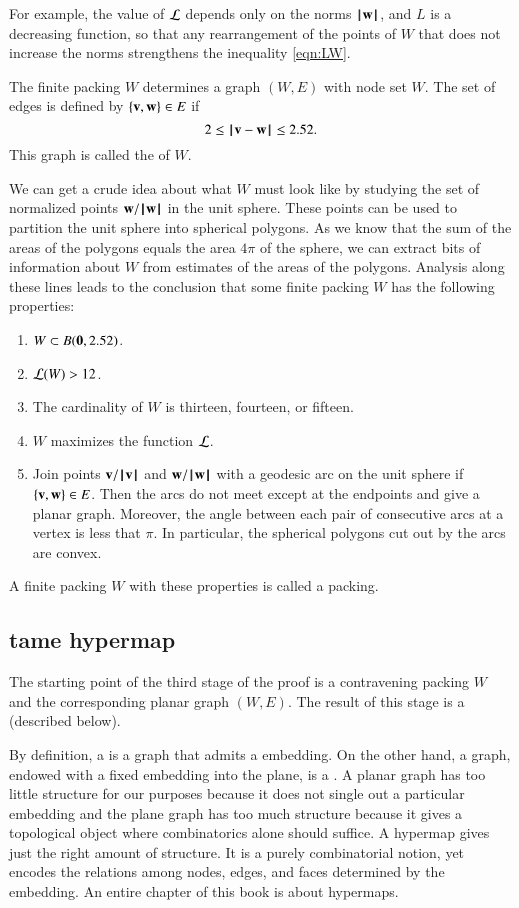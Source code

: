 For example, the value of ${\mathcal L}$
depends only on the norms ${{\hskip0.1em|\hskip-0.15em|\hskip0.1em}{\mathbf w}{\hskip0.1em|\hskip-0.15em|\hskip0.1em}}$, and $L$ is a decreasing
function, so that any rearrangement of the points of $W$ that does not
increase the norms strengthens the inequality \eqref{eqn:LW}.

The finite packing $W$ determines a graph $(W,E)$ with node set $W$.  The set
of edges is defined by $\{{\mathbf v},{\mathbf w}\}\in E$ if 
\[2\le\norm{\v}{\w}\le 2.52.\] This graph is called the  of $W$.

We can get a crude idea about what $W$ must look like by studying the
set of normalized points ${\mathbf w}/{{\hskip0.1em|\hskip-0.15em|\hskip0.1em}{\mathbf w}{\hskip0.1em|\hskip-0.15em|\hskip0.1em}}$ in the unit sphere.  These
points can be used to partition the unit sphere into spherical
polygons.  As we know that the sum of the areas of the polygons equals
the area $4\pi$ of the sphere, we can extract bits of information
about $W$ from estimates of the areas of the polygons.  Analysis along
these lines leads to the conclusion that some finite packing $W$
has the following 
properties:
\begin{enumerate}\wasitemize 
\item $W\subset B({\mathbf 0},2.52)$.
\item ${\mathcal L}(W) > 12$.
\item The cardinality of $W$ is thirteen, fourteen, or fifteen.
\item $W$ maximizes the function ${\mathcal L}$.
\item Join points ${\mathbf v}/{{\hskip0.1em|\hskip-0.15em|\hskip0.1em}{\mathbf v}{\hskip0.1em|\hskip-0.15em|\hskip0.1em}}$ and ${\mathbf w}/{{\hskip0.1em|\hskip-0.15em|\hskip0.1em}{\mathbf w}{\hskip0.1em|\hskip-0.15em|\hskip0.1em}}$ with a geodesic arc on the
unit sphere if $\{{\mathbf v},{\mathbf w}\}\in E$.  Then the arcs do not meet except at the endpoints and
give a planar graph.  Moreover, the angle between each pair of consecutive arcs at a vertex is less
that $\pi$.  In particular, the spherical polygons cut out by the arcs are convex.
\end{enumerate}\wasitemize 
A finite packing $W$ with these properties is called a  packing.


\subsection{tame hypermap}

The starting point of the third stage of the proof is a contravening
packing $W$ and the corresponding planar graph $(W,E)$.  The result of
this stage is a  (described below).

By definition, a  is a graph that admits a
 embedding.  On the other hand, a graph, endowed with
a fixed embedding into the plane, is a .  A
planar graph has too little structure for our purposes because it
does not single out a particular embedding and the plane graph has too
much structure because it gives a topological object where combinatorics
alone should suffice.  A hypermap gives just the right amount of
structure.  It is a purely combinatorial notion, yet encodes the
relations among nodes, edges, and faces determined by the embedding.
An entire chapter of this book is about hypermaps.


